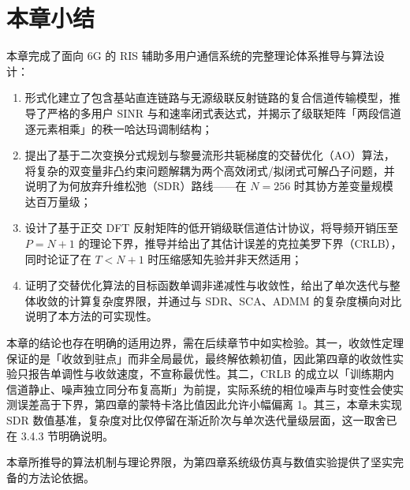 \section{本章小结}
本章完成了面向 6G 的 RIS 辅助多用户通信系统的完整理论体系推导与算法设计：
\begin{enumerate}
  \item 形式化建立了包含基站直连链路与无源级联反射链路的复合信道传输模型，推导了严格的多用户 SINR 与和速率闭式表达式，并揭示了级联矩阵「两段信道逐元素相乘」的秩一哈达玛调制结构；
  \item 提出了基于二次变换分式规划与黎曼流形共轭梯度的交替优化（AO）算法，将复杂的双变量非凸约束问题解耦为两个高效闭式/拟闭式可解凸子问题，并说明了为何放弃升维松弛（SDR）路线——在 $N = 256$ 时其协方差变量规模达百万量级；
  \item 设计了基于正交 DFT 反射矩阵的低开销级联信道估计协议，将导频开销压至 $P = N+1$ 的理论下界，推导并给出了其估计误差的克拉美罗下界（CRLB），同时论证了在 $T < N+1$ 时压缩感知先验并非天然适用；
  \item 证明了交替优化算法的目标函数单调非递减性与收敛性，给出了单次迭代与整体收敛的计算复杂度界限，并通过与 SDR、SCA、ADMM 的复杂度横向对比说明了本方法的可实现性。
\end{enumerate}

本章的结论也存在明确的适用边界，需在后续章节中如实检验。其一，收敛性定理保证的是「收敛到驻点」而非全局最优，最终解依赖初值，因此第四章的收敛性实验只报告单调性与收敛速度，不宣称最优性。其二，CRLB 的成立以「训练期内信道静止、噪声独立同分布复高斯」为前提，实际系统的相位噪声与时变性会使实测误差高于下界，第四章的蒙特卡洛比值因此允许小幅偏离 1。其三，本章未实现 SDR 数值基准，复杂度对比仅停留在渐近阶次与单次迭代量级层面，这一取舍已在 3.4.3 节明确说明。

本章所推导的算法机制与理论界限，为第四章系统级仿真与数值实验提供了坚实完备的方法论依据。
